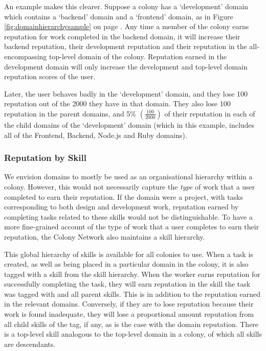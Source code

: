 An example makes this clearer. Suppose a colony has a `development' domain which contains a `backend' domain and a `frontend' domain, as in Figure \ref{fig:domainhierarchysample} on page \pageref{fig:domainhierarchysample}. Any time a member of the colony earns reputation for work completed in the backend domain, it will increase their backend reputation, their development reputation and their reputation in the all-encompassing top-level domain of the colony. Reputation earned in the development domain will only increase the development and top-level domain reputation scores of the user.

Later, the user behaves badly in the `development' domain, and they lose 100 reputation out of the 2000 they have in that domain. They also lose 100 reputation in the parent domains, and 5\% $\left(\frac{100}{2000}\right)$ of their reputation in each of the child domains of the `development' domain (which in this example, includes all of the Frontend, Backend, Node.js and Ruby domains). 

\subsubsection{Reputation by Skill}\label{sec:rep-by-skill}

We envision domains to mostly be used as an organisational hierarchy within a colony. However, this would not necessarily capture the \emph{type} of work that a user completed to earn their reputation. If the domain were a project, with tasks corresponding to both design and development work, reputation earned by completing tasks related to these skills would not be distinguishable.  To have a more fine-grained account of the type of work that a user completes to earn their reputation, the Colony Network also maintains a skill hierarchy.

This global hierarchy of skills is available for all colonies to use. When a task is created, as well as being placed in a particular domain in the colony, it is also tagged with a skill from the skill hierarchy. When the worker earns reputation for successfully completing the task, they will earn reputation in the skill the task was tagged with and all parent skills. This is in addition to the reputation earned in the relevant domains. Conversely, if they are to lose reputation because their work is found inadequate, they will lose a proportional amount reputation from all child skills of the tag, if any, as is the case with the domain reputation. There is a top-level skill analogous to the top-level domain in a colony, of which all skills are descendants.

